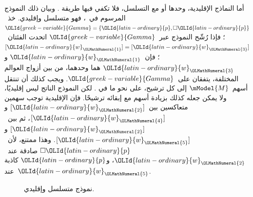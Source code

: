 \documentclass[../../../include/open-logic-section]{subfiles}
\begin{document}


أما النماذج الإقليدية، وحدها أو مع التسلسل، فلا تكفي فيها طريقة
. وبيان ذلك النموذج المرسوم في~،
فهو متسلسل وإقليدي. خذ~$\OLId{greek-variable}{Gamma}=\{\OLId{latin-ordinary}{p},\Box \OLId{latin-ordinary}{p}\}$؛ فإذا رُشّح النموذج
عبر~$\OLId{greek-variable}{Gamma}$ اتحدت الفئتان~$[\OLId{latin-ordinary}{w}_\OLMathNumeral{1}]=[\OLId{latin-ordinary}{w}_\OLMathNumeral{3}]$؛ فإن~$\OLId{latin-ordinary}{w}_\OLMathNumeral{1}$ و$\OLId{latin-ordinary}{w}_\OLMathNumeral{3}$
هما وحدهما، من بين أزواج العوالم المختلفة، يتفقان على~$\OLId{greek-variable}{Gamma}$.
ويجب كذلك أن تنتقل أسهم~$\mModel{M}$ إلى كل ترشيح، على نحو ما في
. لكن النموذج الناتج ليس إقليديًا، ولا يمكن جعله
كذلك بزيادة أسهم مع إبقائه ترشيحًا. فإن الإقليدية توجب سهمين متعاكسين
بين~$[\OLId{latin-ordinary}{w}_\OLMathNumeral{2}]$ و$[\OLId{latin-ordinary}{w}_\OLMathNumeral{4}]$، ثم بين~$[\OLId{latin-ordinary}{w}_\OLMathNumeral{2}]$ و$[\OLId{latin-ordinary}{w}_\OLMathNumeral{5}]$.
وهذا ممتنع، لأن~$\Box \OLId{latin-ordinary}{p}$ صادقة عند~$\OLId{latin-ordinary}{w}_\OLMathNumeral{2}$، و$\OLId{latin-ordinary}{p}$ كاذبة عند~$\OLId{latin-ordinary}{w}_\OLMathNumeral{5}$.

\begin{figure}[htpb]
  \centering
  \caption{نموذج متسلسل وإقليدي.}
\end{figure}
\end{document}
